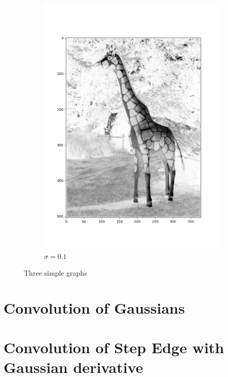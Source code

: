\documentclass[12pt, oneside]{article}
\begin{document}
\begin{figure}[H]
\begin{subfigure}[b]{0.3\textwidth}
        \includegraphics[width=\textwidth]{imgs/q1_plot2.png}
        \caption{$\sigma = 0.1$}
        \label{fig:five over x}
    \end{subfigure}
       \caption{Three simple graphs}
       \label{fig:three graphs}
\end{figure}



\section{Convolution of Gaussians}

\section{Convolution of Step Edge with Gaussian derivative}
\end{document}
